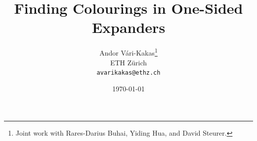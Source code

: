 \title{Finding Colourings in One-Sided Expanders}

\author{%
  Andor Vári-Kakas\thanks{Joint work with Rares-Darius Buhai, Yiding Hua, and David Steurer.}\\
  ETH Zürich\\
  \texttt{avarikakas@ethz.ch}%
}

\date{\today}
